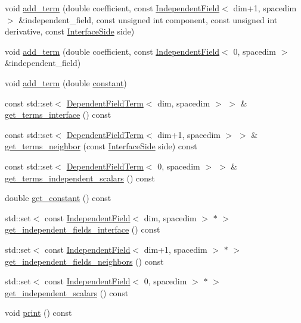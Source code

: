 \begin{DoxyCompactItemize}
void \hyperlink{class_dependent_field_a43de305294f94c38c88fa4768b3f0155}{add\+\_\+term} (double coefficient, const \hyperlink{class_independent_field}{Independent\+Field}$<$ dim+1, spacedim $>$ \&independent\+\_\+field, const unsigned int component, const unsigned int derivative, const \hyperlink{triangulation__system_8h_a44f3c00e36c1d6e3c389ae693c09b435}{Interface\+Side} side)
\item 
void \hyperlink{class_dependent_field_adf9e4863ca954a9fa70c57aef68849f8}{add\+\_\+term} (double coefficient, const \hyperlink{class_independent_field}{Independent\+Field}$<$ 0, spacedim $>$ \&independent\+\_\+field)
\item 
void \hyperlink{class_dependent_field_a72196bff18c2c28a1e811877e739f4ee}{add\+\_\+term} (double \hyperlink{class_dependent_field_a32b37c78e04a16b6b606442f156c8ca9}{constant})
\item 
const std\+::set$<$ \hyperlink{class_dependent_field_term}{Dependent\+Field\+Term}$<$ dim, spacedim $>$ $>$ \& \hyperlink{class_dependent_field_a5fab03134453b1dd4999b90b50a74480}{get\+\_\+terms\+\_\+interface} () const 
\item 
const std\+::set$<$ \hyperlink{class_dependent_field_term}{Dependent\+Field\+Term}$<$ dim+1, spacedim $>$ $>$ \& \hyperlink{class_dependent_field_a3cd8757a280d4ef9232cb304a68ea6f4}{get\+\_\+terms\+\_\+neighbor} (const \hyperlink{triangulation__system_8h_a44f3c00e36c1d6e3c389ae693c09b435}{Interface\+Side} side) const 
\item 
const std\+::set$<$ \hyperlink{class_dependent_field_term}{Dependent\+Field\+Term}$<$ 0, spacedim $>$ $>$ \& \hyperlink{class_dependent_field_a7e17fcef1db1822cac8c12212e3e8755}{get\+\_\+terms\+\_\+independent\+\_\+scalars} () const 
\item 
double \hyperlink{class_dependent_field_a9f255eb459c862a9cbe785084430445b}{get\+\_\+constant} () const 
\item 
std\+::set$<$ const \hyperlink{class_independent_field}{Independent\+Field}$<$ dim, spacedim $>$ $\ast$ $>$ \hyperlink{class_dependent_field_acc7f03e2157ecf784540ec6d17250476}{get\+\_\+independent\+\_\+fields\+\_\+interface} () const 
\item 
std\+::set$<$ const \hyperlink{class_independent_field}{Independent\+Field}$<$ dim+1, spacedim $>$ $\ast$ $>$ \hyperlink{class_dependent_field_a80a0bcfebadff71fdf10fec84097c821}{get\+\_\+independent\+\_\+fields\+\_\+neighbors} () const 
\item 
std\+::set$<$ const \hyperlink{class_independent_field}{Independent\+Field}$<$ 0, spacedim $>$ $\ast$ $>$ \hyperlink{class_dependent_field_ab0bff11e19a2d7035ace9f010b833f14}{get\+\_\+independent\+\_\+scalars} () const 
\item 
void \hyperlink{class_dependent_field_a3f1fd18437bdbb4c9d83b9b841ed242d}{print} () const 
\end{DoxyCompactItemize}

